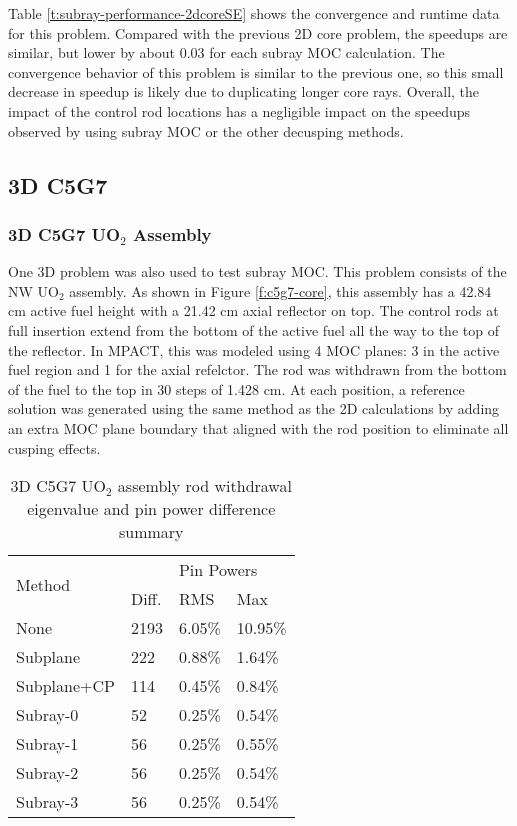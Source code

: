 Table \ref{t:subray-performance-2dcoreSE} shows the convergence and runtime data for this problem.  Compared with the previous 2D core problem, the speedups are similar, but lower by about 0.03 for each subray MOC calculation.  The convergence behavior of this problem is similar to the previous one, so this small decrease in speedup is likely due to duplicating longer core rays.  Overall, the impact of the control rod locations has a negligible impact on the speedups observed by using subray MOC or the other decusping methods.

\subsection{3D C5G7}

\subsubsection{3D C5G7 UO\texorpdfstring{$_2$}{2} Assembly}

One 3D problem was also used to test subray MOC.  This problem consists of the NW UO$_2$ assembly.  As shown in Figure \ref{f:c5g7-core}, this assembly has a 42.84 cm active fuel height with a 21.42 cm axial reflector on top.  The control rods at full insertion extend from the bottom of the active fuel all the way to the top of the reflector.  In MPACT, this was modeled using 4 MOC planes: 3 in the active fuel region and 1 for the axial refelctor.  The rod was withdrawn from the bottom of the fuel to the top in 30 steps of 1.428 cm.  At each position, a reference solution was generated using the same method as the 2D calculations by adding an extra MOC plane boundary that aligned with the rod position to eliminate all cusping effects.

\begin{table}
    \centering
    \caption[3D C5G7 UO$_2$ Assembly Recombination Sensitivity]{3D C5G7 UO$_2$ assembly rod withdrawal eigenvalue and pin power difference summary}\label{t:c5g7-3d-assembly}
    \begin{tabular}{l l l l}\toprule
        \multirow{2}{*}{Method} & \keff{} & \multicolumn{2}{l}{Pin Powers} \\
         & Diff. & RMS & Max \\\midrule
None        & 2193 & 6.05\% & 10.95\% \\
Subplane    & 222  & 0.88\% &  1.64\% \\
Subplane+CP & 114  & 0.45\% &  0.84\% \\
Subray-0    & 52   & 0.25\% &  0.54\% \\
Subray-1    & 56   & 0.25\% &  0.55\% \\
Subray-2    & 56   & 0.25\% &  0.54\% \\
Subray-3    & 56   & 0.25\% &  0.54\% \\
         \bottomrule
    \end{tabular}
\end{table}

